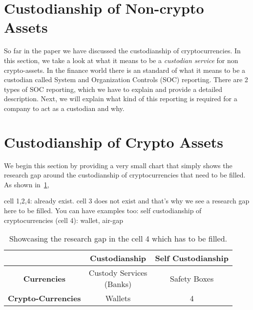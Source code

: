 \section{Custodianship of Non-crypto Assets}

So far in the paper we have discussed the custodianship of cryptocurrencies. In this section, we take a look at what it means to be a \textit{custodian service} for non crypto-assets. In the finance world there is an standard of what it means to be a custodian called System and Organization Controls (SOC) reporting. There are 2 types of SOC reporting, which we have to explain and provide a detailed description. Next, we will explain what kind of this reporting is required for a company to act as a custodian and why. 

\section{Custodianship of Crypto Assets} 

We begin this section by providing a very small chart that simply shows the research gap around the custodianship of cryptocurrencies that need to be filled. As shown in~\ref{tab:motiv}, 

cell 1,2,4: already exist.  cell 3 does not exist and that's why we see a research gap here to be filled.
 You can have examples too: self custodianship of cryptocurrencies (cell 4): wallet, air-gap


 \begin{table}[t]
\centering
\begin{tabular}{|c|c|c|}  
\hline
& \textbf{Custodianship} & \textbf{Self Custodianship}   \\ \hline
\textbf{Currencies} & \shortstack{Custody Services \\ (Banks)} & Safety Boxes \\ \hline
\textbf{Crypto-Currencies} & Wallets & \cellcolor{verylightgray}4 \\
\hline
\end{tabular}
\caption{\footnotesize{Showcasing the research gap in the cell 4 which has to be filled.}
\label{tab:motiv}}
\end{table}







